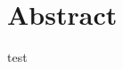 \documentclass[../main.tex]{subfiles}
\begin{document}
	
	\chapter{Abstract}
	test
	
\end{document}
